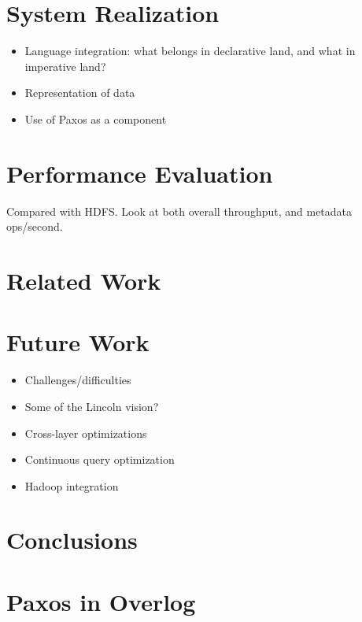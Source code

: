 \documentclass{article}
\begin{document}
\section{System Realization}
\begin{itemize}
\item
  Language integration: what belongs in declarative land, and what in
  imperative land?

\item
  Representation of data

\item
  Use of Paxos as a component
\end{itemize}

\section{Performance Evaluation}
Compared with HDFS. Look at both overall throughput, and metadata ops/second.

\section{Related Work}

\section{Future Work}
\begin{itemize}
\item
  Challenges/difficulties

\item
  Some of the Lincoln vision?

\item
  Cross-layer optimizations

\item
  Continuous query optimization

\item
  Hadoop integration
\end{itemize}

\section{Conclusions}


\appendix
\section{Paxos in Overlog}
\end{document}
